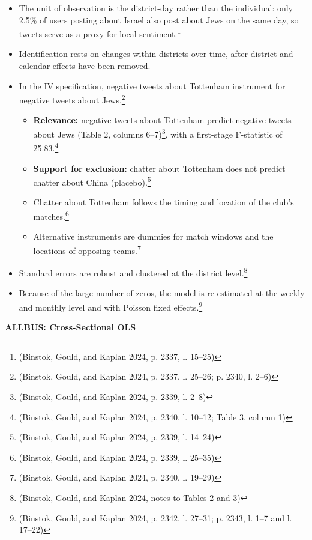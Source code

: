 \begin{itemize}
\item
  The unit of observation is the district-day rather than the individual: only 2.5\% of users posting about Israel also post about Jews on the same day, so tweets serve as a proxy for local sentiment.\footnote{(Binstok, Gould, and Kaplan 2024, p. 2337, l. 15--25)}
\item
  Identification rests on changes within districts over time, after district and calendar effects have been removed.
\item
  In the IV specification, negative tweets about Tottenham instrument for negative tweets about Jews.\footnote{(Binstok, Gould, and Kaplan 2024, p. 2337, l. 25--26; p. 2340, l. 2--6)}

  \begin{itemize}
  \item
    \textbf{Relevance:} negative tweets about Tottenham predict negative tweets about Jews (Table 2, columns 6--7)\footnote{(Binstok, Gould, and Kaplan 2024, p. 2339, l. 2--8)}, with a first-stage F-statistic of 25.83.\footnote{(Binstok, Gould, and Kaplan 2024, p. 2340, l. 10--12; Table 3, column 1)}
  \item
    \textbf{Support for exclusion:} chatter about Tottenham does not predict chatter about China (placebo).\footnote{(Binstok, Gould, and Kaplan 2024, p. 2339, l. 14--24)}
  \item
    Chatter about Tottenham follows the timing and location of the club's matches.\footnote{(Binstok, Gould, and Kaplan 2024, p. 2339, l. 25--35)}
  \item
    Alternative instruments are dummies for match windows and the locations of opposing teams.\footnote{(Binstok, Gould, and Kaplan 2024, p. 2340, l. 19--29)}
  \end{itemize}
\item
  Standard errors are robust and clustered at the district level.\footnote{(Binstok, Gould, and Kaplan 2024, notes to Tables 2 and 3)}
\item
  Because of the large number of zeros, the model is re-estimated at the weekly and monthly level and with Poisson fixed effects.\footnote{(Binstok, Gould, and Kaplan 2024, p. 2342, l. 27--31; p. 2343, l. 1--7 and l. 17--22)}
\end{itemize}

\par\textbf{ALLBUS: Cross-Sectional OLS}\par

